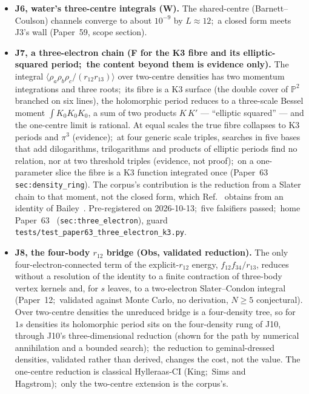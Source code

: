 \documentclass[11pt,a4paper]{article}
\theoremstyle{plain}
\theoremstyle{definition}
\begin{document}
\begin{itemize}
  \item \textbf{J6, water's three-centre integrals (W).} The shared-centre (Barnett--Coulson) channels converge to about $10^{-9}$ by $L \approx 12$;\ a closed form meets J3's wall (Paper~59, scope section).
  \item \textbf{J7, a three-electron chain (F for the K3 fibre and its elliptic-squared period;\ the content beyond them is evidence only).} The integral $\langle \rho_a\rho_b\rho_c/(r_{12}r_{13})\rangle$ over two-centre densities has two momentum integrations and three roots;\ its fibre is a K3 surface (the double cover of $\mathbb{P}^2$ branched on six lines), the holomorphic period reduces to a three-scale Bessel moment $\int K_0K_0K_0$, a sum of two products $K\,K'$ --- ``elliptic squared'' --- and the one-centre limit is rational. At equal scales the true fibre collapses to K3 periods and $\pi^3$ (evidence);\ at four generic scale triples, searches in five bases that add dilogarithms, trilogarithms and products of elliptic periods find no relation, nor at two threshold triples (evidence, not proof);\ on a one-parameter slice the fibre is a K3 function integrated once (Paper~63 \texttt{sec:density\_ring}). The corpus's contribution is the reduction from a Slater chain to that moment, not the closed form, which Ref.~\cite{bbbg2008} obtains from an identity of Bailey~\cite{bailey1936}. Pre-registered on 2026-10-13;\ five falsifiers passed;\ home Paper~63~\cite{paper63} (\texttt{sec:three\_electron}), guard \texttt{tests/test\_paper63\_three\_electron\_k3.py}.
  \item \textbf{J8, the four-body $r_{12}$ bridge (Obs, validated reduction).} The only four-electron-connected term of the explicit-$r_{12}$ energy, $f_{12}f_{34}/r_{13}$, reduces without a resolution of the identity to a finite contraction of three-body vertex kernels and, for $s$ leaves, to a two-electron Slater--Condon integral (Paper~12;\ validated against Monte Carlo, no derivation, $N \ge 5$ conjectural). Over two-centre densities the unreduced bridge is a four-density tree, so for $1s$ densities its holomorphic period sits on the four-density rung of J10, through J10's three-dimensional reduction (shown for the path by numerical annihilation and a bounded search);\ the reduction to geminal-dressed densities, validated rather than derived, changes the cost, not the value. The one-centre reduction is classical Hylleraas-CI (King;\ Sims and Hagstrom);\ only the two-centre extension is the corpus's.

\end{itemize}
\end{document}
